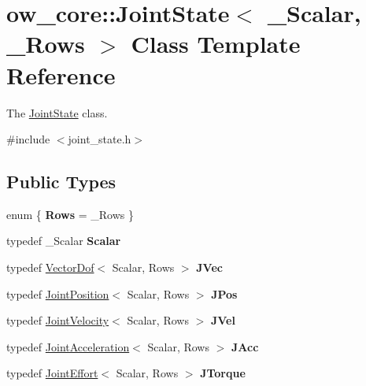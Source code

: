 \hypertarget{classow__core_1_1JointState}{}\section{ow\+\_\+core\+:\+:Joint\+State$<$ \+\_\+\+Scalar, \+\_\+\+Rows $>$ Class Template Reference}
\label{classow__core_1_1JointState}


The \hyperlink{classow__core_1_1JointState}{Joint\+State} class.  




{\ttfamily \#include $<$joint\+\_\+state.\+h$>$}

\subsection*{Public Types}
\begin{DoxyCompactItemize}
\item 
enum \{ {\bfseries Rows} = \+\_\+\+Rows
 \}\hypertarget{classow__core_1_1JointState_a72c9b5d1e8739f05cba3f4d877231f9f}{}\label{classow__core_1_1JointState_a72c9b5d1e8739f05cba3f4d877231f9f}

\item 
typedef \+\_\+\+Scalar {\bfseries Scalar}\hypertarget{classow__core_1_1JointState_aa4aedc0d11f33346be0481efeea485c9}{}\label{classow__core_1_1JointState_aa4aedc0d11f33346be0481efeea485c9}

\item 
typedef \hyperlink{classow__core_1_1VectorDof}{Vector\+Dof}$<$ Scalar, Rows $>$ {\bfseries J\+Vec}\hypertarget{classow__core_1_1JointState_a55aad096a0742060edcc4b13fda49215}{}\label{classow__core_1_1JointState_a55aad096a0742060edcc4b13fda49215}

\item 
typedef \hyperlink{classow__core_1_1JointPosition}{Joint\+Position}$<$ Scalar, Rows $>$ {\bfseries J\+Pos}\hypertarget{classow__core_1_1JointState_a9b3100d10fa3f1ae653453c4c661bb87}{}\label{classow__core_1_1JointState_a9b3100d10fa3f1ae653453c4c661bb87}

\item 
typedef \hyperlink{classow__core_1_1JointVelocity}{Joint\+Velocity}$<$ Scalar, Rows $>$ {\bfseries J\+Vel}\hypertarget{classow__core_1_1JointState_a9de74b73fb283026d2e7d505d1afc9fb}{}\label{classow__core_1_1JointState_a9de74b73fb283026d2e7d505d1afc9fb}

\item 
typedef \hyperlink{classow__core_1_1JointAcceleration}{Joint\+Acceleration}$<$ Scalar, Rows $>$ {\bfseries J\+Acc}\hypertarget{classow__core_1_1JointState_adecba7e0ecf7fd06d470f3dbde49127e}{}\label{classow__core_1_1JointState_adecba7e0ecf7fd06d470f3dbde49127e}

\item 
typedef \hyperlink{classow__core_1_1JointEffort}{Joint\+Effort}$<$ Scalar, Rows $>$ {\bfseries J\+Torque}\hypertarget{classow__core_1_1JointState_aee2a7252c178e5aae9742603bcca56f7}{}\label{classow__core_1_1JointState_aee2a7252c178e5aae9742603bcca56f7}

\end{DoxyCompactItemize}
